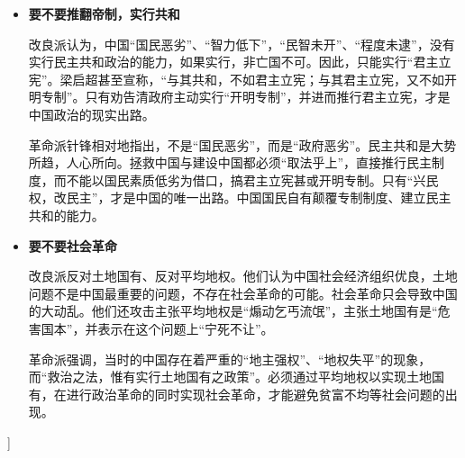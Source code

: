 \begin{enumerate}
\begin{itemize}
			\item{\textbf{要不要推翻帝制，实行共和}\par
				改良派认为，中国“国民恶劣”、“智力低下”，“民智未开”、“程度未逮”，没有实行民主共和政治的能力，如果实行，非亡国不可。因此，只能实行“君主立宪”。梁启超甚至宣称，“与其共和，不如君主立宪；与其君主立宪，又不如开明专制”。只有劝告清政府主动实行“开明专制”，并进而推行君主立宪，才是中国政治的现实出路。\par
				革命派针锋相对地指出，不是“国民恶劣”，而是“政府恶劣”。民主共和是大势所趋，人心所向。拯救中国与建设中国都必须“取法乎上”，直接推行民主制度，而不能以国民素质低劣为借口，搞君主立宪甚或开明专制。只有“兴民权，改民主”，才是中国的唯一出路。中国国民自有颠覆专制制度、建立民主共和的能力。\par
			}
			\item{\textbf{要不要社会革命}\par
				改良派反对土地国有、反对平均地权。他们认为中国社会经济组织优良，土地问题不是中国最重要的问题，不存在社会革命的可能。社会革命只会导致中国的大动乱。他们还攻击主张平均地权是“煽动乞丐流氓”，主张土地国有是“危害国本”，并表示在这个问题上“宁死不让”。\par
				革命派强调，当时的中国存在着严重的“地主强权”、“地权失平”的现象，而“救治之法，惟有实行土地国有之政策”。必须通过平均地权以实现土地国有，在进行政治革命的同时实现社会革命，才能避免贫富不均等社会问题的出现。\par
			}
		\end{itemize}
	]
	

\end{enumerate}
